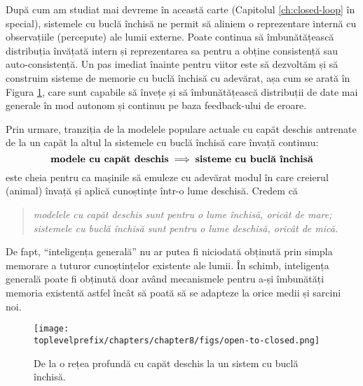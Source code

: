 \documentclass[../../book-main_ro.tex]{subfiles}
\begin{document}
După cum am studiat mai devreme în această carte (Capitolul \ref{ch:closed-loop} în special), sistemele cu buclă închisă ne permit să aliniem o reprezentare internă cu observațiile (percepute) ale lumii externe. Poate continua să îmbunătățească distribuția învățată intern și reprezentarea sa pentru a obține consistență sau auto-consistență. Un pas imediat înainte pentru viitor este să dezvoltăm și să construim sisteme de memorie cu buclă închisă cu adevărat, așa cum se arată în Figura \ref{fig:open-to-closed}, care sunt capabile să învețe și să îmbunătățească distribuții de date mai generale în mod autonom și continuu pe baza feedback-ului de eroare.

Prin urmare, tranziția de la modelele populare actuale cu capăt deschis antrenate de la un capăt la altul la sistemele cu buclă închisă care învață continuu:
\begin{equation}
   \mbox{\textbf{modele cu capăt deschis}} \; \Longrightarrow \; 
   \mbox{\textbf{sisteme cu buclă închisă}}
\end{equation}
este cheia pentru ca mașinile să emuleze cu adevărat modul în care creierul (animal) învață și aplică cunoștințe într-o lume deschisă. Credem că
\begin{quote}
\begin{center}
        {\em modelele cu capăt deschis sunt pentru o lume închisă, oricât de mare; \\ sistemele cu buclă închisă sunt pentru o lume deschisă, oricât de mică.}
\end{center}
\end{quote}
De fapt, ``inteligența generală'' nu ar putea fi niciodată obținută prin simpla memorare a tuturor cunoștințelor existente ale lumii. În schimb, inteligența generală poate fi obținută doar având mecanismele pentru a-și îmbunătăți memoria existentă astfel încât să poată să se adapteze la orice medii și sarcini noi.

\begin{figure}[t]
    \centering    
    \texttt{[image: \\toplevelprefix/chapters/chapter8/figs/open-to-closed.png]}
    \caption{De la o rețea profundă cu capăt deschis la un sistem cu buclă închisă.}
    \label{fig:open-to-closed}
\end{figure}
\end{document}
